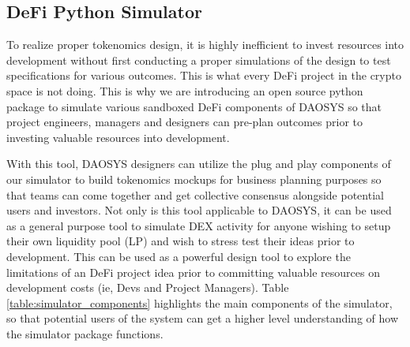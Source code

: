 \documentclass[journal,twocolumn,12pt]{ieeesyscoin}
\begin{document}
\subsection{DeFi Python Simulator}

To realize proper tokenomics design, it is highly inefficient to invest resources into development without first conducting a proper simulations of the design to test specifications for various outcomes. This is what every DeFi project in the crypto space is not doing. This is why we are introducing an open source python package to simulate various sandboxed DeFi components of DAOSYS so that project engineers, managers and designers can pre-plan outcomes prior to investing valuable resources into development.

With this tool, DAOSYS designers can utilize the plug and play components of our simulator to build tokenomics mockups for business planning purposes so that teams can come together and get collective consensus alongside potential users and investors. Not only is this tool applicable to DAOSYS, it can be used as a general purpose tool to simulate DEX activity for anyone wishing to setup their own liquidity pool (LP) and wish to stress test their ideas prior to development. This can be used as a powerful design tool to explore the limitations of an DeFi project idea prior to committing valuable resources on development costs (ie, Devs and Project Managers). Table \ref{table:simulator_components} highlights the main components of the simulator, so that potential users of the system can get a higher level understanding of how the simulator package functions.
\end{document}
